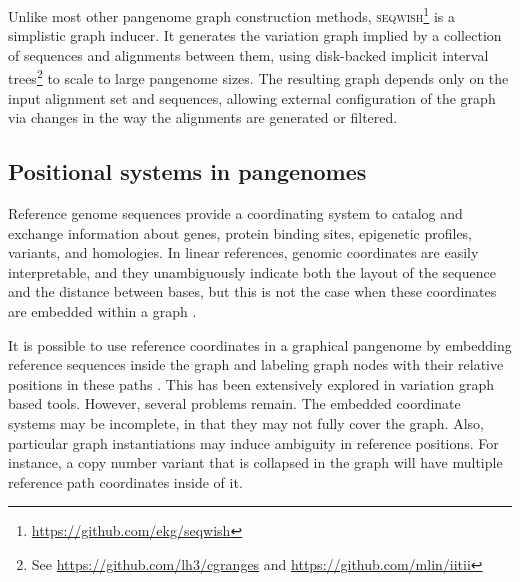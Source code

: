 Unlike most other pangenome graph construction methods, \textsc{seqwish}\footnote{\url{https://github.com/ekg/seqwish}} \cite{Garrison_2019} is a simplistic graph inducer.
It generates the variation graph implied by a collection of sequences and alignments between them, using disk-backed implicit interval trees\footnote{See \url{https://github.com/lh3/cgranges} and \url{https://github.com/mlin/iitii}} to scale to large pangenome sizes.
The resulting graph depends only on the input alignment set and sequences, allowing external configuration of the graph via changes in the way the alignments are generated or filtered.








\subsection{Positional systems in pangenomes}

Reference genome sequences provide a coordinating system to catalog and exchange information about genes, protein binding sites, epigenetic profiles, variants, and homologies.
In linear references, genomic coordinates are easily interpretable, and they unambiguously indicate both the layout of the sequence and the distance between bases, but this is not the case when these coordinates are embedded within a graph \cite{Rand_2017}.

It is possible to use reference coordinates in a graphical pangenome by embedding reference sequences inside the graph and labeling graph nodes with their relative positions in these paths \cite{Garrison_2018,Garrison_2019}.
This has been extensively explored in variation graph based tools.
However, several problems remain.
The embedded coordinate systems may be incomplete, in that they may not fully cover the graph.
Also, particular graph instantiations may induce ambiguity in reference positions.
For instance, a copy number variant that is collapsed in the graph will have multiple reference path coordinates inside of it.

